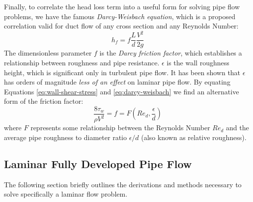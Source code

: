 \documentclass[9pt]{article} %
\numberwithin{equation}{section} %
\begin{document}
\begin{multicols}{2}
Finally, to correlate the head loss term into a useful form for solving pipe flow problems, we have the famous \textit{Darcy-Weisbach equation}, which is a proposed correlation valid for duct flow of any cross section and any Reynolds Number:
\begin{equation} \label{eq:darcy-weisbach}
h_{f} = f{\frac{L}{d}}{\frac{V^{2}}{2{g}}}
\end{equation}
The dimensionless parameter $f$ is the \textit{Darcy friction factor}, which establishes a relationship between roughness and pipe resistance. $\epsilon$ is the wall roughness height, which is significant only in turbulent pipe flow. It has been shown that $\epsilon$ has orders of magnitude \textit{less of an effect} on laminar pipe flow. By equating Equations \ref{eq:wall-shear-stress} and \ref{eq:darcy-weisbach} we find an alternative form of the friction factor:
\begin{equation} \label{eq:darcy-friction}
\frac{8 \tau_{w}}{\rho V^{2}} = f = F(Re_{d}, \frac{\epsilon}{d})
\end{equation}
where $F$ represents some relationship between the Reynolds Number $Re_{d}$ and the average pipe roughness to diameter ratio $\epsilon / d$ (also known as relative roughness).

\subsection{Laminar Fully Developed Pipe Flow}
The following section briefly outlines the derivations and methods necessary to solve specifically a laminar flow problem. 


\end{multicols}
\end{document}
